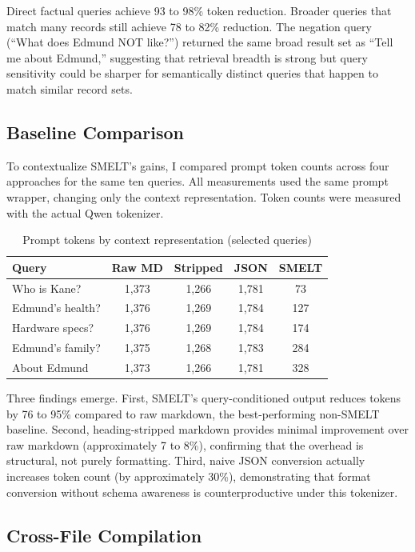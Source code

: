 \documentclass[11pt,a4paper]{article}
\begin{document}
Direct factual queries achieve 93 to 98\% token reduction. Broader queries that match many records still achieve 78 to 82\% reduction. The negation query (``What does Edmund NOT like?'') returned the same broad result set as ``Tell me about Edmund,'' suggesting that retrieval breadth is strong but query sensitivity could be sharper for semantically distinct queries that happen to match similar record sets.

\subsection{Baseline Comparison}

To contextualize SMELT's gains, I compared prompt token counts across four approaches for the same ten queries. All measurements used the same prompt wrapper, changing only the context representation. Token counts were measured with the actual Qwen tokenizer.

\begin{table}[H]
\centering
\caption{Prompt tokens by context representation (selected queries)}
\begin{tabular}{lcccc}
\toprule
\textbf{Query} & \textbf{Raw MD} & \textbf{Stripped} & \textbf{JSON} & \textbf{SMELT} \\
\midrule
Who is Kane? & 1,373 & 1,266 & 1,781 & 73 \\
Edmund's health? & 1,376 & 1,269 & 1,784 & 127 \\
Hardware specs? & 1,376 & 1,269 & 1,784 & 174 \\
Edmund's family? & 1,375 & 1,268 & 1,783 & 284 \\
About Edmund & 1,373 & 1,266 & 1,781 & 328 \\
\bottomrule
\end{tabular}
\end{table}

Three findings emerge. First, SMELT's query-conditioned output reduces tokens by 76 to 95\% compared to raw markdown, the best-performing non-SMELT baseline. Second, heading-stripped markdown provides minimal improvement over raw markdown (approximately 7 to 8\%), confirming that the overhead is structural, not purely formatting. Third, naive JSON conversion actually increases token count (by approximately 30\%), demonstrating that format conversion without schema awareness is counterproductive under this tokenizer.

\subsection{Cross-File Compilation}
\end{document}
